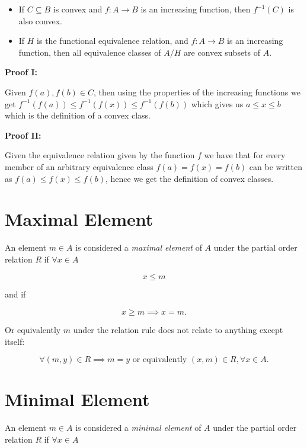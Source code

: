 \begin{itemize}

	\item If \(C \subseteq B\) is convex and \(f: A \to B\) is an increasing function, then \(f^{-1}(C)\) is also convex.

	\item If \(H\) is the functional equivalence relation, and \(f: A \to B\) is an increasing function, then all
	      equivalence classes of \(A / H\) are convex subsets of \(A\).

\end{itemize}

\textbf{Proof I:}

Given \(f(a), f(b) \in C\), then using the properties of the increasing functions we get \(f^{-1}(f(a)) \le f^{-1}(f(x)) \le f^{-1}(f(b))\)
which gives us \(a \le x \le b\) which is the definition of a convex class.

\QED

\textbf{Proof II:}

Given the equivalence relation given by the function \(f\) we have that for every member of an arbitrary equivalence class
\(f(a) = f(x) = f(b)\) can be written as \(f(a) \le f(x) \le f(b)\), hence we get the definition of convex classes.

\QED

\section{Maximal Element}

An element \(m \in A\) is considered a \emph{maximal element} of \(A\) under the partial order relation \(R\) if \(\forall x \in A\)

\[
	x \le m
\]

and if

\[
	x \ge m \implies x = m.
\]

Or equivalently \(m\) under the relation rule does not relate to anything except itself:

\[
	\forall (m, y) \in R \implies m = y \text{ or equivalently } (x, m) \in R, \forall x \in A.
\]

\section{Minimal Element}

An element \(m \in A\) is considered a \emph{minimal element} of \(A\) under the partial order relation \(R\) if \(\forall x \in A\)

